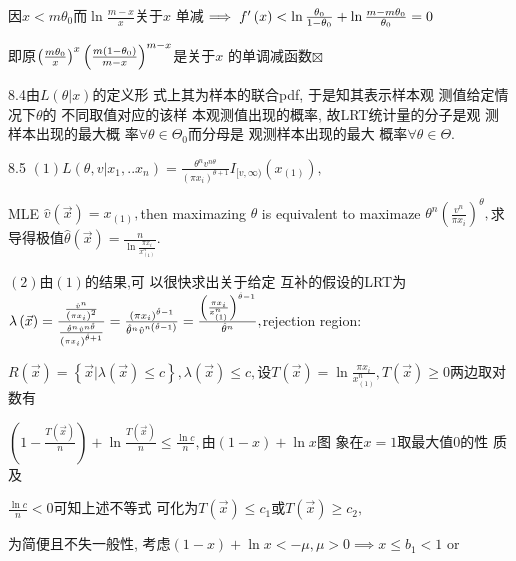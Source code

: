 \documentclass{ctexart}
\begin{document}
因$x<m\theta _{0}$而$\ln \frac{m-x}{x}$关于$x$%
单减$\implies f^{\prime }\left( x\right) <\ln \frac{\theta _{0}}{%
1-\theta _{0}}+\ln \frac{m-m\theta _{0}}{\theta _{0}}=0$

即原$\left( \frac{m\theta _{0}}{x}\right) ^{x}\left( \frac{%
m\left( 1-\theta _{0}\right) }{m-x}\right) ^{m-x}$是关于$x$%
的单调减函数$\boxtimes $

8.4由$L\left( \theta |x\right) $的定义形%
式上其为样本的联合pdf,%
于是知其表示样本观%
测值给定情况下$\theta $的%
不同取值对应的该样%
本观测值出现的概率,%
故LRT统计量的分子是观%
测样本出现的最大概%
率$\forall \theta \in \Theta _{0}$而分母是%
观测样本出现的最大%
概率$\forall \theta \in \Theta .$

8.5 $\left( 1\right) L\left( \theta ,v|x_{1},..x_{n}\right) =\frac{\theta
^{n}v^{n\theta }}{\left( \pi x_{i}\right) ^{\theta +1}}I_{[v,\infty )}\left(
x_{\left( 1\right) }\right) ,$

MLE $\hat{v}\left( \vec{x}\right) =x_{\left( 1\right) },$then maximazing $%
\theta $ is equivalent to maximaze $\theta ^{n}\left( \frac{v^{n}}{\pi x_{i}}%
\right) ^{\theta },$求导得极值$\hat{\theta}%
\left( \vec{x}\right) =\frac{n}{\ln \frac{\pi x_{i}}{x_{\left( 1\right) }^{n}%
}}.$

$\left( 2\right) $由$\left( 1\right) $的结果,可%
以很快求出关于给定%
互补的假设的LRT为$\lambda \left( 
\vec{x}\right) =\frac{\frac{\hat{v}^{n}}{\left( \pi x_{i}\right) ^{2}}}{%
\frac{\hat{\theta}^{n}\hat{v}^{n\hat{\theta}}}{\left( \pi x_{i}\right) ^{%
\hat{\theta}+1}}}=\frac{\left( \pi x_{i}\right) ^{\hat{\theta}-1}}{\hat{%
\theta}^{n}\hat{v}^{n\left( \hat{\theta}-1\right) }}=\frac{\left( \frac{\pi
x_{i}}{x_{\left( 1\right) }^{n}}\right) ^{\hat{\theta}-1}}{\hat{\theta}^{n}}%
, $rejection region:

$R\left( \vec{x}\right) =\left\{ \vec{x}|\lambda \left( \vec{x}\right) \leq
c\right\} ,\lambda \left( \vec{x}\right) \leq c,$设$T\left( \vec{x}%
\right) =\ln \frac{\pi x_{i}}{x_{\left( 1\right) }^{n}},T\left( \vec{x}%
\right) \geq 0$两边取对数有\qquad

$\left( 1-\frac{T\left( \vec{x}\right) }{n}\right) +\ln \frac{T\left( \vec{x}%
\right) }{n}\leq \frac{\ln c}{n},$由$\left( 1-x\right) +\ln x$图%
象在$x=1$取最大值0的性%
质及

$\frac{\ln c}{n}<0$可知上述不等式%
可化为$T\left( \vec{x}\right) \leq c_{1}$或$T\left( 
\vec{x}\right) \geq c_{2},$

为简便且不失一般性,%
考虑$\left( 1-x\right) +\ln x<-\mu ,\mu >0\implies x\leq b_{1}<1$
or
\end{document}
